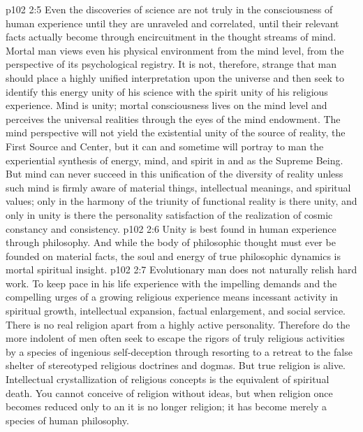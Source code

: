 \vs p102 2:5 Even the discoveries of science are not truly  in the consciousness of human experience until they are unraveled and correlated, until their relevant facts actually become  through encircuitment in the thought streams of mind. Mortal man views even his physical environment from the mind level, from the perspective of its psychological registry. It is not, therefore, strange that man should place a highly unified interpretation upon the universe and then seek to identify this energy unity of his science with the spirit unity of his religious experience. Mind is unity; mortal consciousness lives on the mind level and perceives the universal realities through the eyes of the mind endowment. The mind perspective will not yield the existential unity of the source of reality, the First Source and Center, but it can and sometime will portray to man the experiential synthesis of energy, mind, and spirit in and as the Supreme Being. But mind can never succeed in this unification of the diversity of reality unless such mind is firmly aware of material things, intellectual meanings, and spiritual values; only in the harmony of the triunity of functional reality is there unity, and only in unity is there the personality satisfaction of the realization of cosmic constancy and consistency.
\vs p102 2:6 Unity is best found in human experience through philosophy. And while the body of philosophic thought must ever be founded on material facts, the soul and energy of true philosophic dynamics is mortal spiritual insight.
\pc \vs p102 2:7 Evolutionary man does not naturally relish hard work. To keep pace in his life experience with the impelling demands and the compelling urges of a growing religious experience means incessant activity in spiritual growth, intellectual expansion, factual enlargement, and social service. There is no real religion apart from a highly active personality. Therefore do the more indolent of men often seek to escape the rigors of truly religious activities by a species of ingenious self\hyp{}deception through resorting to a retreat to the false shelter of stereotyped religious doctrines and dogmas. But true religion is alive. Intellectual crystallization of religious concepts is the equivalent of spiritual death. You cannot conceive of religion without ideas, but when religion once becomes reduced only to an  it is no longer religion; it has become merely a species of human philosophy.\plusone
